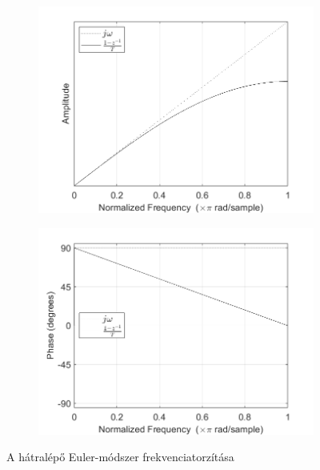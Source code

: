 \begin{figure}[!h]
    \centering
    \begin{subfigure}{0.47\textwidth}
        \centering
        \includegraphics[scale=0.38]{figures/bwEulerA.png}
        \caption{}
    \end{subfigure}
    \hfill
    \begin{subfigure}{0.47\textwidth}
        \centering
        \includegraphics[scale=0.38]{figures/bwEulerP.png}
        \caption{}
    \end{subfigure}
    \caption{A hátralépő Euler-módszer frekvenciatorzítása}
\end{figure}

